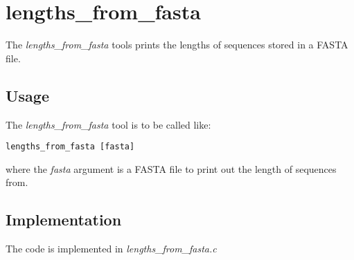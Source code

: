 \section{lengths\_from\_fasta} \label{sec-lengthsfromfasta}

The \emph{lengths\_from\_fasta} tools prints the lengths of sequences
stored in a FASTA file.

\subsection{Usage}

The \emph{lengths\_from\_fasta} tool is to be called like:
\begin{lstlisting}
lengths_from_fasta [fasta]
\end{lstlisting}
where the \emph{fasta} argument is a FASTA file to print out the
length of sequences from.

\subsection{Implementation}
The code is implemented in \emph{lengths\_from\_fasta.c}

